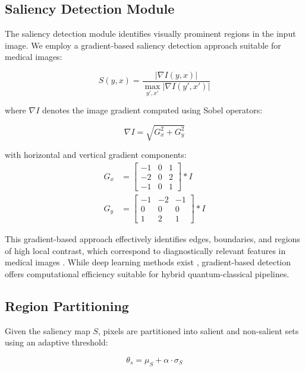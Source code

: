 \documentclass[pdflatex,sn-mathphys-num,Numbered]{sn-jnl}
\theoremstyle{thmstyleone}
\theoremstyle{thmstyletwo}
\theoremstyle{thmstylethree}
\begin{document}
\subsection{Saliency Detection Module}

The saliency detection module identifies visually prominent regions in the input image. We employ a gradient-based saliency detection approach suitable for medical images:

\begin{equation}
S(y, x) = \frac{|\nabla I(y, x)|}{\max_{y',x'} |\nabla I(y', x')|}
\label{eq:saliency_computation}
\end{equation}

where $\nabla I$ denotes the image gradient computed using Sobel operators:

\begin{equation}
\nabla I = \sqrt{G_x^2 + G_y^2}
\label{eq:gradient}
\end{equation}

with horizontal and vertical gradient components:
\begin{align}
G_x &= \begin{bmatrix} -1 & 0 & 1 \\ -2 & 0 & 2 \\ -1 & 0 & 1 \end{bmatrix} * I \\
G_y &= \begin{bmatrix} -1 & -2 & -1 \\ 0 & 0 & 0 \\ 1 & 2 & 1 \end{bmatrix} * I
\end{align}

This gradient-based approach effectively identifies edges, boundaries, and regions of high local contrast, which correspond to diagnostically relevant features in medical images \cite{bib65,bib66,bib67}. While deep learning methods exist \cite{bib56,bib57}, gradient-based detection offers computational efficiency suitable for hybrid quantum-classical pipelines.

\subsection{Region Partitioning}

Given the saliency map $S$, pixels are partitioned into salient and non-salient sets using an adaptive threshold:

\begin{equation}
\theta_s = \mu_S + \alpha \cdot \sigma_S
\label{eq:threshold}
\end{equation}
\end{document}
